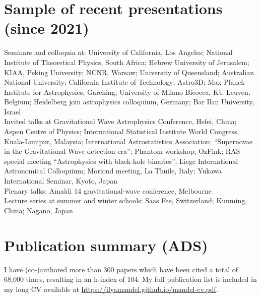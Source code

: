 \documentclass[margin,line]{res}
\begin{document}
\begin{resume}
\section{\sc Sample of recent presentations (since 2021)}

Seminars and colloquia at: University of California, Los Angeles; National Institute of Theoretical Physics, South Africa; Hebrew University of Jerusalem; KIAA, Peking University; NCNR, Warsaw; University of Queensland; Australian National University; California Institute of Technology; Astro3D; Max Planck Institute for Astrophysics, Garching; University of Milano Bicocca; KU Leuven, Belgium; Heidelberg join astrophysics colloquium, Germany; Bar Ilan University, Israel\\
Invited talks at Gravitational Wave Astrophysics Conference, Hefei, China; Aspen Centre of Physics; International Statistical Institute World Congress, Kuala-Lumpur, Malaysia;  International Astrostatistics Association; ``Supernovae in the Gravitational Wave detection era''; Phantom workshop; OzFink; RAS special meeting ``Astrophysics with black-hole binaries''; Liege International Astronomical Colloquium; Moriond meeting, La Thuile, Italy; Yukawa International Seminar, Kyoto, Japan \\
Plenary talks: Amaldi 14 gravitational-wave conference, Melbourne\\
Lecture series at summer and winter schools: Saas Fee, Switzerland; Kunming, China; Nagano, Japan\\



\section{\sc Publication summary (ADS)} 

I have (co-)authored more than 300 papers which have been cited a total of 68,000 times, resulting in an h-index of 104.  My full publication list is included in my long CV available at \url{https://ilyamandel.github.io/mandel-cv.pdf}.


\end{resume}
\end{document}
